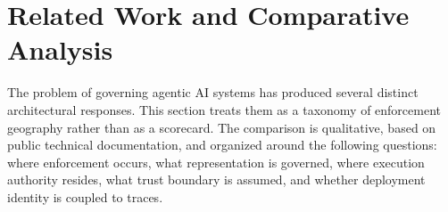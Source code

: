 \documentclass[11pt]{article}
\theoremstyle{remark}
\begin{document}
\section{Related Work and Comparative Analysis}\label{sec:related-work}

The problem of governing agentic AI systems has produced several distinct architectural responses. This section treats them as a taxonomy of enforcement geography rather than as a scorecard. The comparison is qualitative, based on public technical documentation, and organized around the following questions: where enforcement occurs, what representation is governed, where execution authority resides, what trust boundary is assumed, and whether deployment identity is coupled to traces.
\end{document}
